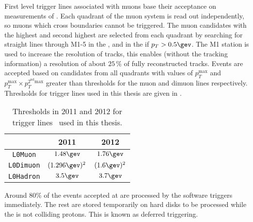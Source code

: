 First level trigger lines associated with muons base their acceptance on measurements of \pt.
Each quadrant of the muon system is read out independently, so muons which cross boundaries cannot
be triggered.
The muon candidates with the highest and second highest \pt are selected from each quadrant by
searching for straight lines through M1-5 in the , and in the  if
$p_T>0.5\gev$.
The M1 station is used to increase the \pt resolution of tracks, this enables (without the
tracking information) a resolution of about $25\,\%$ of fully reconstructed tracks.
Events are accepted based on candidates from all quadrants with values of $p_T^\mathrm{max}$ and
$p_T^\mathrm{max}\times p_T^\mathrm{2^{nd} max}$ greater than thresholds for the muon and dimuon
lines respectively.
Thresholds for \lone trigger lines used in this thesis are given in .

\begin{table}
  \caption[Level one trigger threholds]
  {\small
    Thresholds in 2011 and 2012 for \lone trigger lines~\cite{Albrecht:2013fba} used in this thesis.
  }
  \label{tab:lhcb:trigger}
  \begin{center}
    \begin{tabular}{ccc}\toprule
      &2011&2012\\\midrule
      {\tt L0Muon} & $1.48\gev$ & $1.76\gev$ \\
      {\tt L0Dimuon} & $(1.296\gev)^2$ & $(1.6\gev)^2$ \\
      {\tt L0Hadron} & $3.5\gev$ & $3.7\gev$ \\
      \bottomrule
    \end{tabular}
  \end{center}
\end{table}

Around $80\%$ of the events accepted at \lone are processed by the software triggers immediately.
The rest are stored temporarily on hard disks to be processed while the \lhc is not colliding protons.
This is known as deferred triggering.

